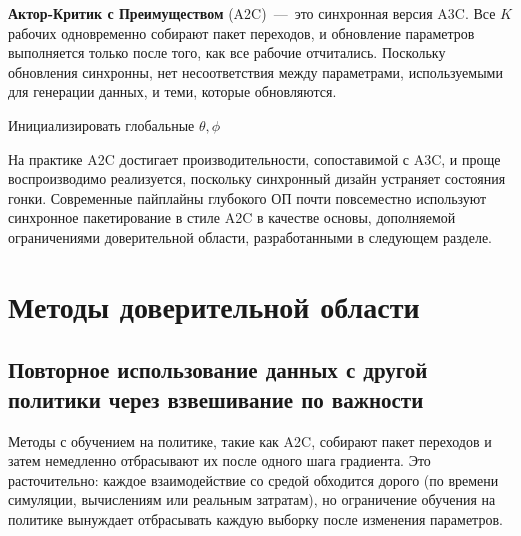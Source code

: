 \textbf{Актор-Критик с Преимуществом} (A2C) \,---\, это синхронная версия A3C. Все $K$ рабочих одновременно собирают пакет переходов, и обновление параметров выполняется только после того, как все рабочие отчитались. Поскольку обновления синхронны, нет несоответствия между параметрами, используемыми для генерации данных, и теми, которые обновляются.

\begin{algorithm}[ht]
\caption{Актор-Критик с Преимуществом (A2C)}
\label{alg:a2c}
\DontPrintSemicolon
{}
Инициализировать глобальные $\theta, \phi$\;
\end{algorithm}

На практике A2C достигает производительности, сопоставимой с A3C, и проще воспроизводимо реализуется, поскольку синхронный дизайн устраняет состояния гонки. Современные пайплайны глубокого ОП почти повсеместно используют синхронное пакетирование в стиле A2C в качестве основы, дополняемой ограничениями доверительной области, разработанными в следующем разделе.

\section{Методы доверительной области}
\label{sec:trpo}

\subsection{Повторное использование данных с другой политики через взвешивание по важности}

Методы с обучением на политике, такие как A2C, собирают пакет переходов и затем немедленно отбрасывают их после одного шага градиента. Это расточительно: каждое взаимодействие со средой обходится дорого (по времени симуляции, вычислениям или реальным затратам), но ограничение обучения на политике вынуждает отбрасывать каждую выборку после изменения параметров.

